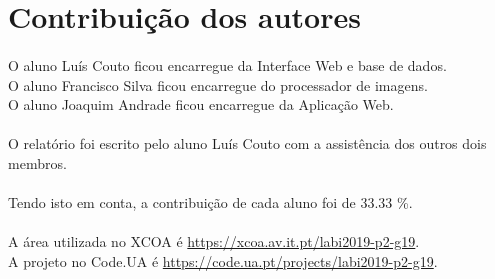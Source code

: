 \documentclass{report}
\begin{document}
\section{Contribuição dos autores}
\paragraph{}
O aluno Luís Couto ficou encarregue da Interface Web e base de dados. \\
O aluno Francisco Silva ficou encarregue do processador de imagens. \\
O aluno Joaquim Andrade ficou encarregue da Aplicação Web. 
\paragraph{}
O relatório foi escrito pelo aluno Luís Couto com a assistência dos outros dois membros.
\paragraph{}
Tendo isto em conta, a contribuição de cada aluno foi de 33.33 \%.
\paragraph{}
A área utilizada no XCOA é \href{https://xcoa.av.it.pt/labi2019-p2-g19}{https://xcoa.av.it.pt/labi2019-p2-g19}.
\\
A projeto no Code.UA é \href{https://code.ua.pt/projects/labi2019-p2-g19}{https://code.ua.pt/projects/labi2019-p2-g19}.

\printbibliography
\end{document}
